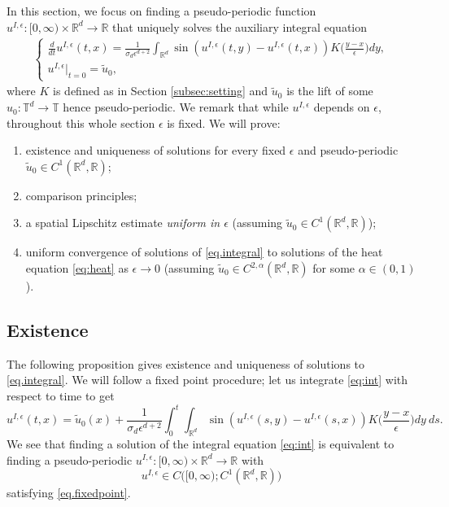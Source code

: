 \documentclass[a4paper,11pt]{amsart}
\newcommand{\red}[1]{{#1}}
\newcommand{\R}{\mathbb{R}}
\newcommand{\T}{\mathbb{T}}
\newcommand{\ep}{\epsilon}
\numberwithin{equation}{section}
\numberwithin{theorem}{section}
\theoremstyle{definition}
\begin{document}
In this section, we focus on \red{finding a pseudo-periodic function $u^{I,\ep}:[0,\infty)\times\R^d\to\R$  that uniquely solves} the auxiliary integral equation 
\begin{eqnarray}\label{eq.integral}
\begin{cases}
\displaystyle{\frac{d}{dt}}u^{I,\ep}(t,x)=\frac{1}{\sigma_d\ep^{d+2}}\int_{\red{\R^d}}\sin\left(u^{I,\ep}(t,y)-u^{I,\ep}(t,x)\right)K\Big(\frac{y-x}{\ep}\Big)dy, \label{eq:int}\\[10pt]
u^{I,\ep}|_{t=0}=\red{\tilde u_0,}
\end{cases}
\end{eqnarray}
where $K$ is defined as in Section \ref{subsec:setting} and \red{$\tilde u_0$ is the lift of some $u_0:\T^d\to\T$ hence pseudo-periodic.} We remark that while $u^{I,\ep}$ depends on $\ep$, \red{throughout this whole section $\ep$ is fixed}. %
We will prove:
\begin{enumerate}
\item existence and uniqueness of solutions for every fixed $\ep$ and \red{pseudo-periodic $\tilde u_0\in C^1(\R^d,\R)$};
\item comparison principles;
\item a spatial Lipschitz estimate {\it{uniform in $\epsilon$}} (assuming \red{$\tilde u_0\in C^1(\R^d,\R)$});
\item uniform convergence of solutions of \eqref{eq.integral} to solutions of the heat equation \eqref{eq:heat} as $\ep \to 0$ (assuming \red{$\tilde u_0\in C^{2,\alpha}(\R^d,\R)$} for some $\alpha\in(0,1)$).
\end{enumerate}

\subsection{Existence}

The following proposition gives existence and uniqueness of solutions to \eqref{eq.integral}. %
We will follow a fixed point procedure; let us integrate \eqref{eq:int} with respect to time to get
\begin{equation}\label{eq.fixedpoint}
u^{I,\ep}(t,x) =\tilde u_0(x) + \frac{1}{\sigma_d\ep^{d+2}}\int_0^t\int_{\red{\R^d}}\sin\left(u^{I,\ep}(s,y) - u^{I,\ep}(s,x)\right)K\Big(\frac{y-x}{\ep}\Big)dy\:ds.
\end{equation}
We see that finding a solution of the integral equation \eqref{eq:int} is equivalent to finding \red{a pseudo-periodic $u^{I,\ep}:[0,\infty)\times\R^d\to\R$ with}
\[
\red{u^{I,\ep}\in C\big([0,\infty);C^1(\R^d, \R)\big)}
\]
satisfying \eqref{eq.fixedpoint}. 
\end{document}
